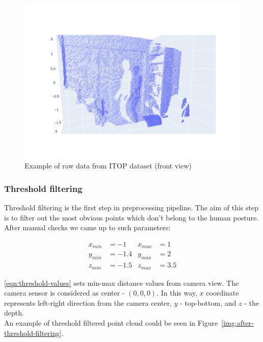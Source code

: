 \begin{figure}[htbp]
    \centerline{
        \includegraphics[trim=370 200 400 200,clip,scale=.25]{Figures/example-of-raw-data.png}
    }
    \caption{Example of raw data from ITOP dataset (front view)}
    \label{img:example-of-raw-data}
\end{figure}

\subsubsection{Threshold filtering}
\label{s:threshold-filtering}
Threshold filtering is the first step in preprocessing pipeline. The aim of this step is to filter out the most obvious points which don't belong to the human posture.
After manual checks we came up to such parameters:  

\begin{equation}
    \begin{aligned}
        x_{min} &= -1   &x_{max} &= 1 \\
        y_{min} &= -1.4 &y_{max} &= 2 \\
        z_{min} &= -1.5 &z_{max} &= 3.5
    \end{aligned}
\label{eqn:threshold-values}
\end{equation}

\ref{eqn:threshold-values} sets min-max distance values from camera view. The camera sensor is considered as center - $(0, 0, 0)$. In this way, $x$ coordinate represents left-right direction from the camera center, $y$ - top-bottom, and $z$ - the depth. \\
An example of threshold filtered point cloud could be seen in Figure~\ref{img:after-threshold-filtering}.

